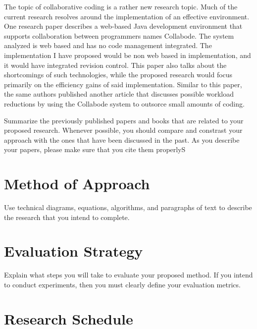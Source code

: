 \documentclass[11pt]{article}
\begin{document}
The topic of collaborative coding is a rather new research topic. Much of the current research resolves around the implementation of an effective environment. One research paper describes a web-based Java development environment that supports collaboration between programmers names Collabode.\cite{Goldman:2011:RCC:2047196.2047215} The system analyzed is web based and has no code management integrated. The implementation I have proposed would be non web based in implementation, and it would have integrated revision control. This paper also talks about the shortcomings of such technologies, while the proposed research would focus primarily on the efficiency gains of said implementation. Similar to this paper, the same authors published another article that discusses possible workload reductions by using the Collabode system to outsorce small amounts of coding. \cite{Goldman:2011:CCC:1984642.1984658} 

Summarize the previously published papers and books that are related
to your proposed research.  Whenever possible, you should compare and
constrast your approach with the ones that have been discussed in the
past.  As you describe your papers, please make sure that you cite
them properlyS

\vspace*{-.2in}
\section{Method of Approach}
\label{sec:method}
\vspace*{-.1in}

Use technical diagrams, equations, algorithms, and paragraphs of text
to describe the research that you intend to complete.

\vspace*{-.2in}
\section{Evaluation Strategy}
\label{sec:evaluate}
\vspace*{-.1in}

Explain what steps you will take to evaluate your proposed method.  If
you intend to conduct experiments, then you must clearly define your
evaluation metrics.

\vspace*{-.1in}
\section{Research Schedule}
\label{sec:schedule}
\vspace*{-.1in}
\end{document}
